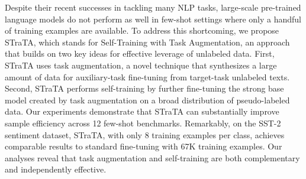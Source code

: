 Despite their recent successes in tackling many NLP tasks, large-scale pre-trained language models do not perform as well in few-shot settings where only a handful of training examples are available. To address this shortcoming, we propose STraTA, which stands for Self-Training with Task Augmentation, an approach that builds on two key ideas for effective leverage of unlabeled data. First, STraTA uses task augmentation, a novel technique that synthesizes a large amount of data for auxiliary-task fine-tuning from target-task unlabeled texts. Second, STraTA performs self-training by further fine-tuning the strong base model created by task augmentation on a broad distribution of pseudo-labeled data. Our experiments demonstrate that STraTA can substantially improve sample efficiency across 12 few-shot benchmarks. Remarkably, on the SST-2 sentiment dataset, STraTA, with only 8 training examples per class, achieves comparable results to standard fine-tuning with 67K training examples. Our analyses reveal that task augmentation and self-training are both complementary and independently effective.
